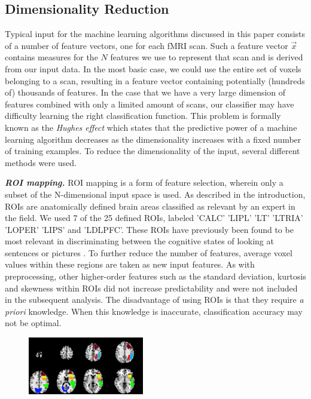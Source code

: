 \documentclass[preprint,journal,11pt]{vgtc}
\begin{document}
\subsection{Dimensionality Reduction}
\label{sec:dimensionalityReduction}
Typical input for the machine learning algorithms discussed in this paper consists of a number of feature vectors, one for each fMRI scan. Such a feature vector $\vec{x}$ contains measures for the $N$ features we use to represent that scan and is derived from our input data. In the most basic case, we could use the entire set of voxels belonging to a scan, resulting in a feature vector containing potentially (hundreds of) thousands of features.
In the case that we have a very large dimension of features combined with only a limited amount of scans, our classifier may have difficulty learning the right classification function. This problem is formally known as the \textit{Hughes effect}\cite{Hughes1054102} which states that the predictive power of a machine learning algorithm decreases as the dimensionality increases with a fixed number of training examples. To reduce the dimensionality of the input, several different methods were used.

\textbf{\emph{ROI mapping.}} ROI mapping is a form of feature selection, wherein only a subset of the N-dimensional input space is used. As described in the introduction, ROIs are anatomically defined brain areas classified as relevant by an expert in the field. We used 7 of the 25 defined ROIs, labeled  'CALC' 'LIPL' 'LT' 'LTRIA' 'LOPER' 'LIPS' and  'LDLPFC'. These ROIs have previously been found to be most relevant in discriminating between the cognitive states of looking at sentences or pictures \cite{wa:2003betw}. To further reduce the number of features, average voxel values within these regions are taken as new input features. As with preprocessing, other higher-order features such as the standard deviation, kurtosis and skewness within ROIs did not increase predictability and were not included in the subsequent analysis. The disadvantage of using ROIs is that they require \textit{a priori} knowledge. When this knowledge is inaccurate, classification accuracy may not be optimal.

\begin{figure}
	\centering
	\includegraphics[width=0.45\textwidth]{figures/flying_dutchman}
  	\caption{}
  	\label{fig:bold_response}
\end{figure}
\end{document}

